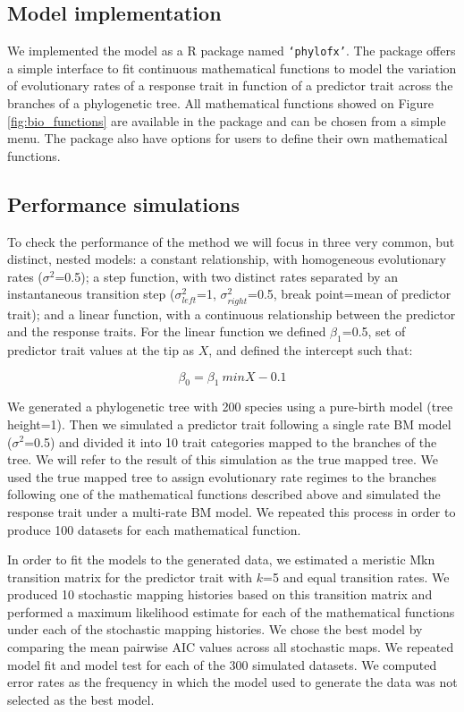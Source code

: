 \subsection{Model implementation}

We implemented the model as a R package named \texttt{`phylofx'}. The package offers a simple interface to fit continuous mathematical functions to model the variation of evolutionary rates of a response trait in function of a predictor trait across the branches of a phylogenetic tree. All mathematical functions showed on Figure \ref{fig:bio_functions} are available in the package and can be chosen from a simple menu. The package also have options for users to define their own mathematical functions.

\subsection{Performance simulations}

To check the performance of the method we will focus in three very common, but distinct, nested models: a constant relationship, with homogeneous evolutionary rates ($\sigma^{2}$=0.5); a step function, with two distinct rates separated by an instantaneous transition step ($\sigma^{2}_{left}$=1, $\sigma^{2}_{right}$=0.5, break point=mean of predictor trait); and a linear function, with a continuous relationship between the predictor and the response traits. For the linear function we defined $\beta_{1}$=0.5, set of predictor trait values at the tip as $X$, and defined the intercept such that:

\begin{equation}
\beta_{0} = \beta_{1} \ min X - 0.1
\end{equation}

We generated a phylogenetic tree with 200 species using a pure-birth model (tree height=1). Then we simulated a predictor trait following a single rate BM model ($\sigma^{2}$=0.5) and divided it into 10 trait categories mapped to the branches of the tree. We will refer to the result of this simulation as the true mapped tree. We used the true mapped tree to assign evolutionary rate regimes to the branches following one of the mathematical functions described above and simulated the response trait under a multi-rate BM model. We repeated this process in order to produce 100 datasets for each mathematical function.

In order to fit the models to the generated data, we estimated a meristic Mkn transition matrix for the predictor trait with $\mathit{k}$=5 and equal transition rates. We produced 10 stochastic mapping histories based on this transition matrix and performed a maximum likelihood estimate for each of the mathematical functions under each of the stochastic mapping histories. We chose the best model by comparing the mean pairwise AIC values across all stochastic maps. We repeated model fit and model test for each of the 300 simulated datasets. We computed error rates as the frequency in which the model used to generate the data was not selected as the best model.

